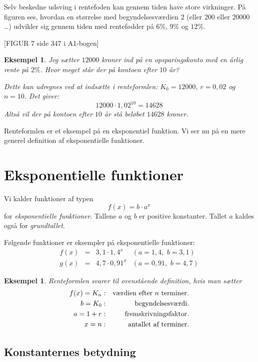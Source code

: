 \documentclass[12pt,oneside,a4paper]{article}
\newcommand{\bas}{\begin{eqnarray*}}
\newcommand{\eas}{\end{eqnarray*}}
\newtheorem{eks}[thm]{Eksempel}
\begin{document}
Selv beskedne udsving i rentefoden kan gennem tiden have store virkninger. På
figuren ses, hvordan en størrelse med begyndelsesværdien 2 (eller 200 eller
20000 \ldots) udvikler sig gennem tiden med rentefødder på $6\%$, $9\%$ og
$12\%$.

[FIGUR 7 side 347 i A1-bogen]

\begin{eks}
    Jeg sætter $12000$ kroner ind på en opsparingskonto med en årlig rente på
    $2\%$. Hvor meget står der på kontoen efter $10$ år?

    Dette kan udregnes ved at indsætte i renteformlen: $K_0 = 12000$, $r = 0,02$
    og $n = 10$. Det giver:
    $$
    12000 \cdot 1,02^{10} = 14628
    $$
    Altså vil der på kontoen efter $10$ år stå beløbet $14628$ kroner.
\end{eks}

Renteformlen er et eksempel på en eksponentiel funktion. Vi ser nu på en mere generel
definition af eksponentielle funktioner.

\section{Eksponentielle funktioner}
Vi kalder funktioner af typen
$$
f(x) = b\cdot a^x
$$
for {\em eksponentielle funktioner}. Tallene $a$ og $b$ er positive konstanter.
Tallet $a$ kaldes også for {\em grundtallet}.

Følgende funktioner er 
eksempler på eksponentielle funktioner:
$$
\begin{array}{rcll}
    f(x) &=& 3,1 \cdot 1,4^x & (a=1,4, \,\,b=3,1) \\
    g(x) &=& 4,7 \cdot 0,91^x & (a=0,91, \,\,b=4,7) 
\end{array}
$$

\begin{eks}
    Renteformlen svarer til ovenstående definition, hvis man sætter
    \bas
    f(x) = K_n & : & \hbox{værdien efter $n$ terminer.} \\
       b = K_0 & : & \hbox{begyndelsesværdi.} \\
       a = 1+r & : & \hbox{fremskrivningsfaktor.} \\
       x = n   & : & \hbox{antallet af terminer.}
    \eas
\end{eks}

\subsection{Konstanternes betydning}
\end{document}
